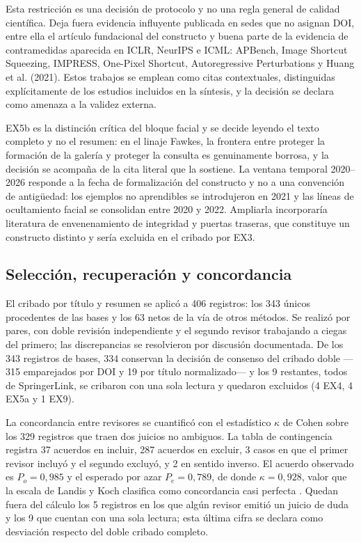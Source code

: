 \documentclass[pdflatex,sn-mathphys-num]{sn-jnl}
\theoremstyle{thmstyleone}
\theoremstyle{thmstyletwo}
\theoremstyle{thmstylethree}
\begin{document}
Esta restricción es una decisión de protocolo y no una regla general de calidad científica. Deja fuera evidencia influyente publicada en sedes que no asignan DOI, entre ella el artículo fundacional del constructo y buena parte de la evidencia de contramedidas aparecida en ICLR, NeurIPS e ICML: APBench, Image Shortcut Squeezing, IMPRESS, One-Pixel Shortcut, Autoregressive Perturbations y Huang et al. (2021). Estos trabajos se emplean como citas contextuales, distinguidas explícitamente de los estudios incluidos en la síntesis, y la decisión se declara como amenaza a la validez externa.

EX5b es la distinción crítica del bloque facial y se decide leyendo el texto completo y no el resumen: en el linaje Fawkes, la frontera entre proteger la formación de la galería y proteger la consulta es genuinamente borrosa, y la decisión se acompaña de la cita literal que la sostiene. La ventana temporal 2020--2026 responde a la fecha de formalización del constructo y no a una convención de antigüedad: los ejemplos no aprendibles se introdujeron en 2021 y las líneas de ocultamiento facial se consolidan entre 2020 y 2022. Ampliarla incorporaría literatura de envenenamiento de integridad y puertas traseras, que constituye un constructo distinto y sería excluida en el cribado por EX3.

\subsection{Selección, recuperación y concordancia}\label{sec:cribado}

El cribado por título y resumen se aplicó a 406 registros: los 343 únicos procedentes de las bases y los 63 netos de la vía de otros métodos. Se realizó por pares, con doble revisión independiente y el segundo revisor trabajando a ciegas del primero; las discrepancias se resolvieron por discusión documentada. De los 343 registros de bases, 334 conservan la decisión de consenso del cribado doble ---315 emparejados por DOI y 19 por título normalizado--- y los 9 restantes, todos de SpringerLink, se cribaron con una sola lectura y quedaron excluidos (4 EX4, 4 EX5a y 1 EX9).

La concordancia entre revisores se cuantificó con el estadístico $\kappa$ de Cohen sobre los 329 registros que traen dos juicios no ambiguos. La tabla de contingencia registra 37 acuerdos en incluir, 287 acuerdos en excluir, 3 casos en que el primer revisor incluyó y el segundo excluyó, y 2 en sentido inverso. El acuerdo observado es $P_o = 0{,}985$ y el esperado por azar $P_e = 0{,}789$, de donde $\kappa = 0{,}928$, valor que la escala de Landis y Koch clasifica como concordancia casi perfecta \cite{landis1977measurement}. Quedan fuera del cálculo los 5 registros en los que algún revisor emitió un juicio de duda y los 9 que cuentan con una sola lectura; esta última cifra se declara como desviación respecto del doble cribado completo.
\end{document}
